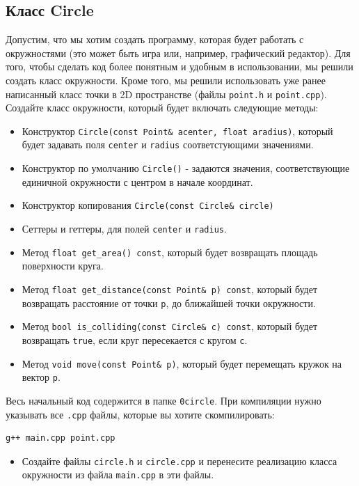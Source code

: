\documentclass{article}
\begin{document}
\subsection*{Класс Circle}
Допустим, что мы хотим создать программу, которая будет работать с окружностями (это может быть игра или, например, графический редактор). Для того, чтобы сделать код более понятным и удобным в использовании, мы решили создать класс окружности. Кроме того, мы решили использовать уже ранее написанный класс точки в 2D пространстве (файлы \texttt{point.h} и \texttt{point.cpp}). Создайте класс окружности, который будет включать следующие методы:
\begin{itemize}
\item Конструктор \texttt{Circle(const Point\& acenter, float aradius)}, который будет задавать поля \texttt{center} и \texttt{radius} соответстующими значениями.
\item Конструктор по умолчанию \texttt{Circle()} - задаются значения, соответствующие единичной окружности с центром в начале координат.
\item Конструктор копирования \texttt{Circle(const Circle\& circle)}
\item Сеттеры и геттеры, для полей \texttt{center} и \texttt{radius}.
\item Метод \texttt{float get\_area() const}, который будет возвращать площадь поверхности круга.
\item Метод \texttt{float get\_distance(const Point\& p) const}, который будет возвращать расстояние от точки \texttt{p}, до ближайшей точки окружности.
\item Метод \texttt{bool is\_colliding(const Circle\& c) const}, который будет возвращать \texttt{true}, если круг пересекается с кругом \texttt{c}.
\item Метод \texttt{void move(const Point\& p)}, который будет перемещать кружок на вектор \texttt{p}.
\end{itemize}
Весь начальный код содержится в папке \texttt{0circle}. При компиляции нужно указывать все \texttt{.cpp} файлы, которые вы хотите скомпилировать:
\begin{verbatim}
g++ main.cpp point.cpp
\end{verbatim}
\begin{itemize}
\item Создайте файлы \texttt{circle.h} и \texttt{circle.cpp} и перенесите реализацию класса окружности из файла \texttt{main.cpp} в эти файлы.
\end{itemize}
\end{document}
